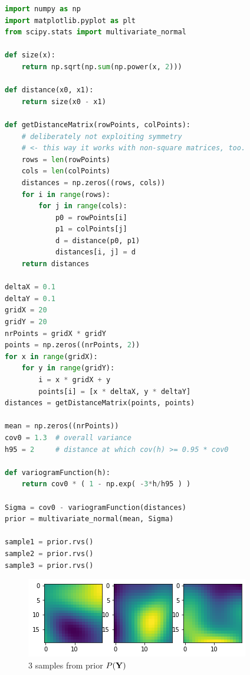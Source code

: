\begin{lstlisting}[language=python]
import numpy as np
import matplotlib.pyplot as plt
from scipy.stats import multivariate_normal

def size(x):
    return np.sqrt(np.sum(np.power(x, 2)))

def distance(x0, x1):
    return size(x0 - x1)

def getDistanceMatrix(rowPoints, colPoints):
    # deliberately not exploiting symmetry 
    # <- this way it works with non-square matrices, too.
    rows = len(rowPoints)
    cols = len(colPoints)
    distances = np.zeros((rows, cols))
    for i in range(rows):
        for j in range(cols): 
            p0 = rowPoints[i]
            p1 = colPoints[j]
            d = distance(p0, p1)
            distances[i, j] = d
    return distances

deltaX = 0.1
deltaY = 0.1
gridX = 20
gridY = 20
nrPoints = gridX * gridY
points = np.zeros((nrPoints, 2))
for x in range(gridX):
    for y in range(gridY):
        i = x * gridX + y
        points[i] = [x * deltaX, y * deltaY]
distances = getDistanceMatrix(points, points)

mean = np.zeros((nrPoints))
cov0 = 1.3  # overall variance
h95 = 2     # distance at which cov(h) >= 0.95 * cov0

def variogramFunction(h):
    return cov0 * ( 1 - np.exp( -3*h/h95 ) )

Sigma = cov0 - variogramFunction(distances)
prior = multivariate_normal(mean, Sigma)

sample1 = prior.rvs()
sample2 = prior.rvs()
sample3 = prior.rvs()
\end{lstlisting}

\begin{figure}[H]
    \caption{3 samples from prior $P(\mathbf{Y})$}
    \centering
    \includegraphics[width=0.7\linewidth]{images/gp_prior_samples.png}
\end{figure}

